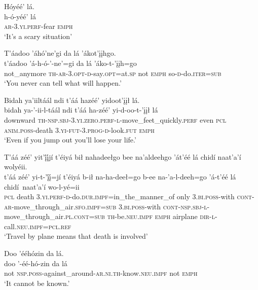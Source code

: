 \ea\label{ex:text9-9-13}
Hóyéé’ lá.\\
\gll h-ó-yéé’	lá\\
     \textsc{ar}-3.\textsc{yi}.\textsc{perf}-fear	\textsc{emph}\\
\glt `It’s a scary situation'
\z

\ea\label{ex:text9-9-14}
T’áadoo ’áhó’ne’gi da lá ’ákot’įįhgo.\\
\gll t’áadoo	’á-h-ó-’-ne’=gi	da	lá	’áko-t-’įįh=go\\
     not\_anymore	\textsc{th}-\textsc{ar}-3.\textsc{opt}-\textsc{d}-say.\textsc{opt}=at.\textsc{sp}	not	\textsc{emph}	so-\textsc{d}-do.\textsc{iter}=\textsc{sub}\\
\glt `You never can tell what will happen.'
\z

\ea\label{ex:text9-9-15}
Bidah ya’iiltáál ndi t’áá hazéé’ yidoot’įįł lá.\\
\gll bidah	ya-’-ii-l-táál	ndi	t’áá	ha-zéé’	yi-d-oo-t-’įįł	lá\\
     downward	\textsc{th}-\textsc{nsp}.\textsc{sbj}-3.\textsc{yi}.\textsc{zero}.\textsc{perf}-\textsc{l}-move\_feet\_quickly.\textsc{perf}	even	\textsc{pcl}	\textsc{anim}.\textsc{poss}-death	3.\textsc{yi}-\textsc{fut}-3.\textsc{prog}-\textsc{d}-look.\textsc{fut}	\textsc{emph}\\
\glt `Even if you jump out you'll lose your life.'
\z

\ea\label{ex:text9-9-16}
T’áá zéé’ yit’į́į́jí t’éiyá bił nahadeełgo bee na’aldeehgo ’át’éé lá chidí naat’a’í wolyéii.\\
\gll t’áá	zéé’	yi-t-’į́į́=jí	t’éiyá	b-ił	na-ha-deeł=go	b-ee	na-’a-l-deeh=go	’á-t’éé	lá	chidí~{naat’a’í}	wo-l-yé=ii\\
     \textsc{pcl}	death	3.\textsc{yi}.\textsc{perf}-\textsc{d}-do.\textsc{dur}.\textsc{impf}=in\_the\_manner\_of	only	3.\textsc{bi}.\textsc{poss}-with	\textsc{cont}-\textsc{ar}-move\_through\_air.\textsc{sfo}.\textsc{impf}=\textsc{sub}	3.\textsc{bi}.\textsc{poss}-with	\textsc{cont}-\textsc{nsp}.\textsc{sbj}-\textsc{l}-move\_through\_air.\textsc{pl}.\textsc{cont}=\textsc{sub}	\textsc{th}-be.\textsc{neu}.\textsc{impf}	\textsc{emph}	airplane	\textsc{dir}-\textsc{l}-call.\textsc{neu}.\textsc{impf}=\textsc{pcl}.\textsc{ref}\\
\glt `Travel by plane means that death is involved'
\z

\ea\label{ex:text9-9-17}
Doo ’ééhózin da lá.\\
\gll doo	’-éé-hó-zin	da	lá\\
     not	\textsc{nsp}.\textsc{poss}-against\_around-\textsc{ar}.\textsc{ni}.\textsc{th}-know.\textsc{neu}.\textsc{impf}	not	\textsc{emph}\\
\glt `It cannot be known.'
\z

